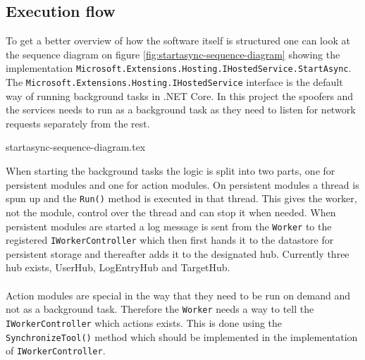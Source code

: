 \documentclass{article}
\begin{document}
\subsection{Execution flow}
To get a better overview of how the software itself is structured one can look at the sequence diagram on figure \ref{fig:startasync-sequence-diagram} showing the implementation \texttt{Microsoft.Extensions.Hosting.IHostedService.StartAsync}. The \texttt{Microsoft.Extensions.Hosting.IHostedService} interface is the default way of running background tasks in .NET Core\cite{url:implementation:microsoft:hosted-service}. In this project the spoofers and the services needs to run as a background task as they need to listen for network requests separately from the rest.

{startasync-sequence-diagram.tex}

When starting the background tasks the logic is split into two parts, one for persistent modules and one for action modules. On persistent modules a thread is spun up and the \texttt{Run()} method is executed in that thread. This gives the worker, not the module, control over the thread and can stop it when needed. When persistent modules are started a log message is sent from the \texttt{Worker} to the registered \texttt{IWorkerController} which then first hands it to the datastore for persistent storage and thereafter adds it to the designated hub. Currently three hub exists, UserHub, LogEntryHub and TargetHub.
\\\\
Action modules are special in the way that they need to be run on demand and not as a background task. Therefore the \texttt{Worker} needs a way to tell the \texttt{IWorkerController} which actions exists. This is done using the \texttt{SynchronizeTool()} method which should be implemented in the implementation of \texttt{IWorkerController}.
\end{document}
